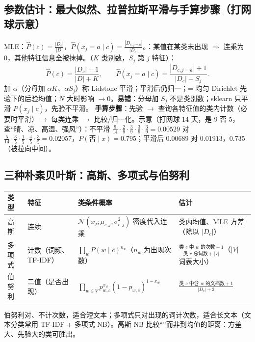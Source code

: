 \subsection{参数估计：最大似然、拉普拉斯平滑与手算步骤（打网球示意）}
MLE：$\hat P(c)=\frac{|D_c|}{|D|}$，$\hat P(x_j=a\mid c)=\frac{|D_{c,j=a}|}{|D_c|}$。：某值在某类未出现 $\Rightarrow$ 连乘为 0，其他特征信息全被抹掉。（$K$ 类别数，$S_j$ 第 $j$ 特征）：
\[
\hat P(c)=\frac{|D_c|+1}{|D|+K},\qquad \hat P(x_j=a\mid c)=\frac{|D_{c,j=a}|+1}{|D_c|+S_j}.
\]
加 $\alpha$（分母加 $\alpha K$、$\alpha S_j$）称 Lidstone 平滑；平滑后仍归一；= 均匀 Dirichlet 先验下的后验均值；$N$ 大时影响 $\to0$。\textbf{易错}：分母加 $S_j$ 不是类别数；sklearn 只平滑 $P(x_j\mid c)$，先验不平滑。
\textbf{手算步骤}：先验 $\to$ 查询各特征值的类内计数（必要时平滑）$\to$ 每类连乘 $\to$ 比较/归一化。示意（打网球 14 天，是 9 否 5，查“晴、凉、高湿、强风”）：不平滑 $\frac9{14}\cdot\frac29\cdot\frac39\cdot\frac39\cdot\frac39=0.00529$ 对 $\frac5{14}\cdot\frac35\cdot\frac15\cdot\frac45\cdot\frac35=0.02057$，$P(\text{否}\mid x)=0.795$；平滑后 $0.00689$ 对 $0.01913$，$0.735$（被拉向中间）。

\subsection{三种朴素贝叶斯：高斯、多项式与伯努利}
\begin{center}\small
\begin{tabularx}{\linewidth}{@{}p{1.6cm}p{2.3cm}p{4.6cm}L@{}}
\toprule
类型 & 特征 & 类条件概率 & 估计 \\
\midrule
高斯 & 连续 & $\mathcal N(x_j;\mu_{c,j},\sigma^2_{c,j})$ 密度代入连乘 & 类内均值、MLE 方差（除以 $|D_c|$）\\
多项式 & 计数（词频、TF-IDF） & $\prod_wP(w\mid c)^{n_w}$（$n_w$ 为出现次数） & $\frac{\text{类 }c\text{ 中 }w\text{ 的次数}+1}{\text{类 }c\text{ 总词数}+|V|}$（$|V|$ 词表大小）\\
伯努利 & 二值（是否出现） & $\prod_{w\in V}p_{w,c}^{x_w}(1-p_{w,c})^{1-x_w}$ & $\frac{\text{类 }c\text{ 中含 }w\text{ 的文档数}+1}{|D_c|+2}$ \\
\bottomrule
\end{tabularx}
\end{center}
伯努利对、不计次数，适合短文本；多项式只对出现的词计次数，适合长文本（文本分类常用 TF-IDF + 多项式 NB）。高斯 NB 比较“”而非到均值的距离：方差大、先验大的类可胜出。

